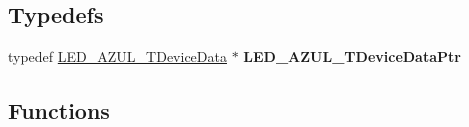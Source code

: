 \subsection*{Typedefs}
\begin{DoxyCompactItemize}
\item 
typedef \hyperlink{struct_l_e_d___a_z_u_l___t_device_data}{L\+E\+D\+\_\+\+A\+Z\+U\+L\+\_\+\+T\+Device\+Data} $\ast$ {\bfseries L\+E\+D\+\_\+\+A\+Z\+U\+L\+\_\+\+T\+Device\+Data\+Ptr}\hypertarget{group___l_e_d___a_z_u_l__module_ga38714c837e8a2180d164811d2071447e}{}\label{group___l_e_d___a_z_u_l__module_ga38714c837e8a2180d164811d2071447e}

\end{DoxyCompactItemize}
\subsection*{Functions}
